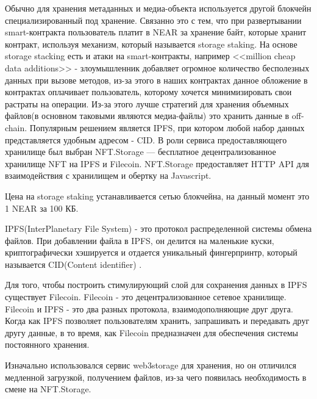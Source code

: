 Обычно для хранения метаданных и медиа-объекта используется другой блокчейн специализированный под хранение. Связанно это с тем, что при развертывании smart-контракта пользователь платит в NEAR за хранение байт, которые хранит контракт, используя механизм, который называется storage staking. На основе storage stacking есть и атаки на smart-контракты, например <<million cheap data additions>> - злоумышленник добавляет огромное количество бесполезных данных при вызове методов, из-за этого в наших контрактах данное обложение в контрактах оплачивает пользователь, которому хочется минимизировать свои растраты на операции. Из-за этого лучше стратегий для хранения объемных файлов(в основном таковыми являются медиа-файлы) это хранить данные в off-chain. Популярным решением является IPFS, при котором любой набор данных представляется удобным адресом - CID. В роли сервиса предоставляющего хранилище был выбран NFT.Storage\cite{nftstorage} --- бесплатное децентрализованное хранилище NFT на IPFS\cite{ipfs} и Filecoin\cite{filecoin}. NFT.Storage предоставляет HTTP API для взаимодействия с хранилищем и обертку на Javascript.

\begin{remark}
    Цена на storage staking устанавливается сетью блокчейна, на данный момент это 1 NEAR за 100 КБ.
\end{remark}

\begin{definition}
    IPFS(InterPlanetary File System) - это протокол распределенной системы обмена файлов. При добавлении файла в IPFS, он делится на маленькие куски, криптографически хэшируется и отдается уникальный фингерпринтр, который называется CID(Content identifier) \cite{ipfs}.
\end{definition}

\begin{remark}
    Для того, чтобы построить стимулирующий слой для сохранения данных в IPFS существует Filecoin. Filecoin - это децентрализованное сетевое хранилище. Filecoin и IPFS - это два разных протокола, взаимодополняющие друг друга. Когда как IPFS позволяет пользователям хранить, запрашивать и передавать друг другу данные, в то время, как Filecoin предназначен для обеспечения системы постоянного хранения.
\end{remark}

\begin{remark}
    Изначально использовался сервис web3storage\cite{web3storage} для хранения, но он отличился медленной загрузкой, получением файлов, из-за чего появилась необходимость в смене на NFT.Storage.
\end{remark}

